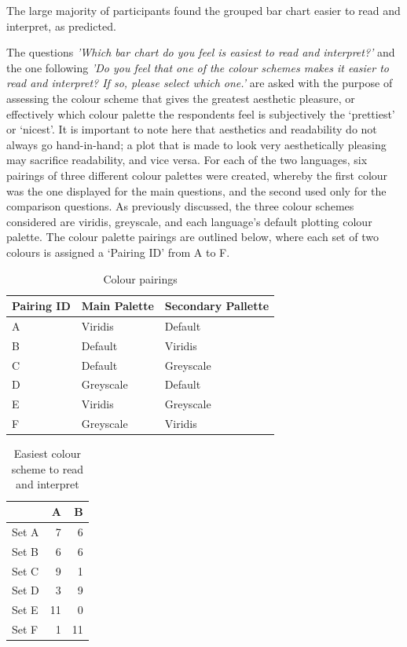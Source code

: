 \documentclass[
  11pt,
]{book}
\begin{document}
The large majority of participants found the grouped bar chart easier to
read and interpret, as predicted.

The questions
\textit{'Which bar chart do you feel is easiest to read and interpret?'}
and the one following
\textit{'Do you feel that one of the colour schemes makes it easier to read and interpret? If so, please select which one.'}
are asked with the purpose of assessing the colour scheme that gives the
greatest aesthetic pleasure, or effectively which colour palette the
respondents feel is subjectively the `prettiest' or `nicest'. It is
important to note here that aesthetics and readability do not always go
hand-in-hand; a plot that is made to look very aesthetically pleasing
may sacrifice readability, and vice versa. For each of the two
languages, six pairings of three different colour palettes were created,
whereby the first colour was the one displayed for the main questions,
and the second used only for the comparison questions. As previously
discussed, the three colour schemes considered are viridis, greyscale,
and each language's default plotting colour palette. The colour palette
pairings are outlined below, where each set of two colours is assigned a
`Pairing ID' from A to F.

\begin{table}[!h]

\caption{\label{tab:unnamed-chunk-68}Colour pairings}
\centering
\begin{tabular}[t]{l|l|l}
\hline
Pairing ID & Main Palette & Secondary Pallette\\
\hline
A & Viridis & Default\\
\hline
B & Default & Viridis\\
\hline
C & Default & Greyscale\\
\hline
D & Greyscale & Default\\
\hline
E & Viridis & Greyscale\\
\hline
F & Greyscale & Viridis\\
\hline
\end{tabular}
\end{table}

\begin{table}[!h]

\caption{\label{tab:unnamed-chunk-69}Easiest colour scheme to read and interpret}
\centering
\begin{tabular}[t]{l|r|r}
\hline
  & A & B\\
\hline
Set A & 7 & 6\\
\hline
Set B & 6 & 6\\
\hline
Set C & 9 & 1\\
\hline
Set D & 3 & 9\\
\hline
Set E & 11 & 0\\
\hline
Set F & 1 & 11\\
\hline
\end{tabular}
\end{table}
\end{document}
